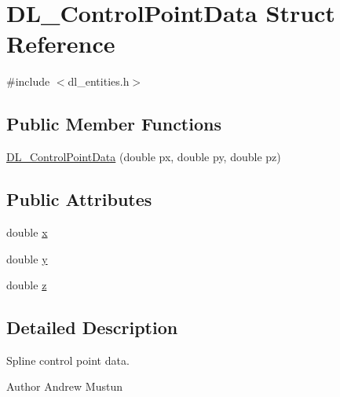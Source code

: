 \hypertarget{structDL__ControlPointData}{\section{D\-L\-\_\-\-Control\-Point\-Data Struct Reference}
\label{structDL__ControlPointData}
}


{\ttfamily \#include $<$dl\-\_\-entities.\-h$>$}

\subsection*{Public Member Functions}
\begin{DoxyCompactItemize}
\item 
\hyperlink{structDL__ControlPointData_afca51af79dd2e04da99ca67cb05c4dbc}{D\-L\-\_\-\-Control\-Point\-Data} (double px, double py, double pz)
\end{DoxyCompactItemize}
\subsection*{Public Attributes}
\begin{DoxyCompactItemize}
\item 
double \hyperlink{structDL__ControlPointData_a0a100ae9328345372eeee06d3ce4ae50}{x}
\item 
double \hyperlink{structDL__ControlPointData_a0392960fa7f5949e584bf0a086dcc902}{y}
\item 
double \hyperlink{structDL__ControlPointData_a0ee38b90fceb1a8fe4340e01d4ff16d1}{z}
\end{DoxyCompactItemize}


\subsection{Detailed Description}
Spline control point data.

\begin{DoxyAuthor}{Author}
Andrew Mustun 
\end{DoxyAuthor}


